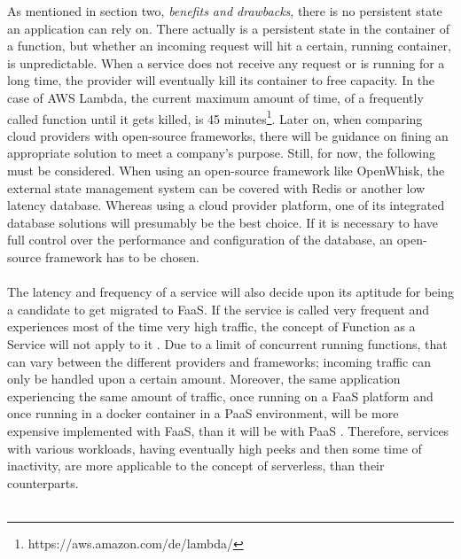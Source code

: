 \documentclass[11pt]{article}
\begin{document}
As mentioned in section two, \textit{benefits and drawbacks}, there is no persistent state an application can rely on. There actually is a persistent state in the container of a function, but whether an incoming request will hit a certain, running container, is unpredictable. When a service does not receive any request or is running for a long time, the provider will eventually kill its container to free capacity. In the case of AWS Lambda, the current maximum amount of time, of a frequently called function until it gets killed, is 45 minutes\footnote{https://aws.amazon.com/de/lambda/}. Later on, when comparing cloud providers with open-source frameworks, there will be guidance on fining an appropriate solution to meet a company's purpose. Still, for now, the following must be considered. When using an open-source framework like OpenWhisk, the external state management system can be covered with Redis or another low latency database. Whereas using a cloud provider platform, one of its integrated database solutions will presumably be the best choice. If it is necessary to have full control over the performance and configuration of the database, an open-source framework has to be chosen. \\\\
The latency and frequency of a service will also decide upon its aptitude for being a candidate to get migrated to FaaS. If the service is called very frequent and experiences most of the time very high traffic, the concept of Function as a Service will not apply to it  \cite{jonas2019cloud}. Due to a limit of concurrent running functions, that can vary between the different providers and frameworks; incoming traffic can only be handled upon a certain amount. Moreover, the same application experiencing the same amount of traffic, once running on a FaaS platform and once running in a docker container in a PaaS environment, will be more expensive implemented with FaaS, than it will be with PaaS \cite{jonas2019cloud}. Therefore, services with various workloads, having eventually high peeks and then some time of inactivity, are more applicable to the concept of serverless, than their counterparts. \\\\
\end{document}
